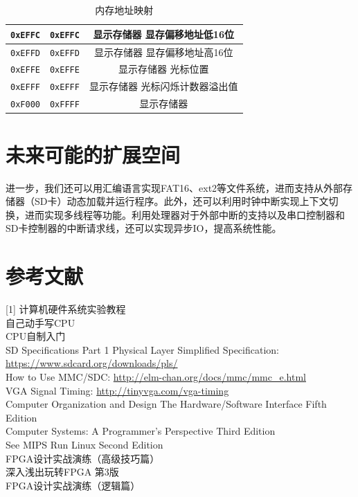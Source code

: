 \documentclass[11pt,utf8]{report}
\begin{document}
\begin{table}[h]
\begin{tabular}{c|c|c}
\texttt{0xEFFC} & \texttt{0xEFFC} & 显示存储器 显存偏移地址低16位 \\ \hline
\texttt{0xEFFD} & \texttt{0xEFFD} & 显示存储器 显存偏移地址高16位 \\ \hline
\texttt{0xEFFE} & \texttt{0xEFFE} & 显示存储器 光标位置 \\ \hline
\texttt{0xEFFF} & \texttt{0xEFFF} & 显示存储器 光标闪烁计数器溢出值 \\ \hline
\texttt{0xF000} & \texttt{0xFFFF} & 显示存储器 \\
\bottomrule[1.2pt]
\end{tabular}
\caption{内存地址映射}
\label{mmap}
\end{table}

\chapter{未来可能的扩展空间}
	\par 进一步，我们还可以用汇编语言实现FAT16、ext2等文件系统，进而支持从外部存储器（SD卡）动态加载并运行程序。此外，还可以利用时钟中断实现上下文切换，进而实现多线程等功能。利用处理器对于外部中断的支持以及串口控制器和SD卡控制器的中断请求线，还可以实现异步IO，提高系统性能。

\chapter{参考文献}

[1] 计算机硬件系统实验教程 \\
[2] 自己动手写CPU \\
[3] CPU自制入门 \\
[4] SD Specifications Part 1 Physical Layer Simplified Specification: \url{https://www.sdcard.org/downloads/pls/} \\
[5] How to Use MMC/SDC: \url{http://elm-chan.org/docs/mmc/mmc\_e.html} \\
[6] VGA Signal Timing: \url{http://tinyvga.com/vga-timing} \\
[7] Computer Organization and Design The Hardware/Software Interface Fifth Edition \\
[8] Computer Systems: A Programmer's Perspective Third Edition \\
[9] See MIPS Run Linux Second Edition \\
[10] FPGA设计实战演练（高级技巧篇） \\
[11] 深入浅出玩转FPGA 第3版 \\
[12] FPGA设计实战演练（逻辑篇） \\
\end{document}

